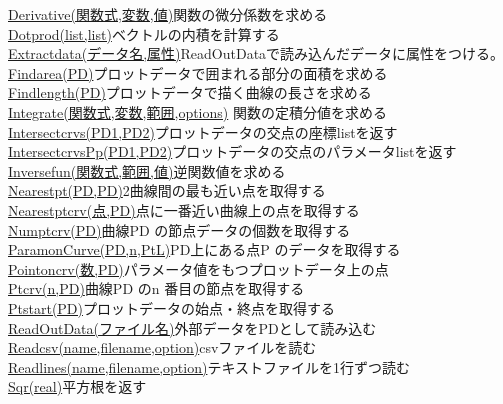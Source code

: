 \documentclass[papersize,a4paper,12pt,uplatex]{jsarticle}
\begin{document}
\begin{tabbing}
\hyperlink{derivative}{Derivative(関数式,変数,値)}\>関数の微分係数を求める\\
\hyperlink{dotprod}{Dotprod(list,list)}\>ベクトルの内積を計算する\\
\hyperlink{extractdata}{Extractdata(データ名,属性)}\>ReadOutDataで読み込んだデータに属性をつける。\\
\hyperlink{findarea}{Findarea(PD)}\>プロットデータで囲まれる部分の面積を求める\\
\hyperlink{findlength}{Findlength(PD)}\>プロットデータで描く曲線の長さを求める\\
\hyperlink{integrate}{Integrate(関数式,変数,範囲,options)} \>関数の定積分値を求める\\
\hyperlink{intersectcrvs}{Intersectcrvs(PD1,PD2)}\>プロットデータの交点の座標listを返す\\
\hyperlink{intersectcrvspp}{IntersectcrvsPp(PD1,PD2)}\>プロットデータの交点のパラメータlistを返す\\
\hyperlink{inversefun}{Inversefun(関数式,範囲,値)}\>逆関数値を求める\\
\hyperlink{nearestpt}{Nearestpt(PD,PD)}\>2曲線間の最も近い点を取得する\\
\hyperlink{nearestptcrv}{Nearestptcrv(点,PD)}\>点に一番近い曲線上の点を取得する\\
\hyperlink{numptcrv}{Numptcrv(PD)}\>曲線PD の節点データの個数を取得する\\
\hyperlink{paramoncrv}{ParamonCurve(PD,n,PtL)}\>PD上にある点P のデータを取得する\\
\hyperlink{pointoncrv}{Pointoncrv(数,PD)}\>パラメータ値をもつプロットデータ上の点\\
\hyperlink{ptcrv}{Ptcrv(n,PD)}\>曲線PD のn 番目の節点を取得する\\
\hyperlink{ptstart}{Ptstart(PD)}\>プロットデータの始点・終点を取得する\\
\hyperlink{readoutdata}{ReadOutData(ファイル名)}\>外部データをPDとして読み込む\\
\hyperlink{readcsv}{Readcsv(name,filename,option)}\>csvファイルを読む\\
\hyperlink{readlines}{Readlines(name,filename,option)}\>テキストファイルを1行ずつ読む\\
\hyperlink{sqr}{Sqr(real)}\>平方根を返す\\

\end{tabbing}
\end{document}
